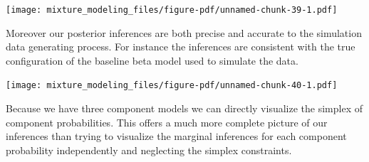 \documentclass[
  letterpaper,
  DIV=11,
  numbers=noendperiod]{scrartcl}
\newenvironment{Shaded}{\begin{snugshade}}{\end{snugshade}}
\newcommand{\AttributeTok}[1]{\textcolor[rgb]{0.40,0.45,0.13}{#1}}
\newcommand{\DecValTok}[1]{\textcolor[rgb]{0.68,0.00,0.00}{#1}}
\newcommand{\FunctionTok}[1]{\textcolor[rgb]{0.28,0.35,0.67}{#1}}
\newcommand{\NormalTok}[1]{\textcolor[rgb]{0.00,0.23,0.31}{#1}}
\newcommand{\SpecialCharTok}[1]{\textcolor[rgb]{0.37,0.37,0.37}{#1}}
\newcommand{\StringTok}[1]{\textcolor[rgb]{0.13,0.47,0.30}{#1}}
\begin{document}
\texttt{[image: mixture\_modeling\_files/figure-pdf/unnamed-chunk-39-1.pdf]}

Moreover our posterior inferences are both precise and accurate to the
simulation data generating process. For instance the inferences are
consistent with the true configuration of the baseline beta model used
to simulate the data.

\begin{Shaded}
\end{Shaded}

\texttt{[image: mixture\_modeling\_files/figure-pdf/unnamed-chunk-40-1.pdf]}

Because we have three component models we can directly visualize the
simplex of component probabilities. This offers a much more complete
picture of our inferences than trying to visualize the marginal
inferences for each component probability independently and neglecting
the simplex constraints.
\end{document}
